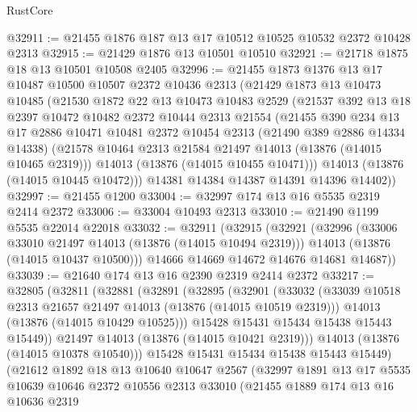 \begin{lexlean}{RustCore}
\begin{coremodule}
@32911 := @21455 @1876 @187 @13 @17 @10512 @10525 @10532 @2372 @10428 @2313
@32915 := @21429 @1876 @13 @10501 @10510
@32921 := @21718 @1875 @18 @13 @10501 @10508 @2405
@32996 := @21455
    @1873
    @1376
    @13
    @17
    @10487
    @10500
    @10507
    @2372
    @10436
    @2313
    (@21429
      @1873
      @13
      @10473
      @10485
      (@21530
        @1872
        @22
        @13
        @10473
        @10483
        @2529
        (@21537
          @392
          @13
          @18
          @2397
          @10472
          @10482
          @2372
          @10444
          @2313
          @21554
          (@21455
            @390
            @234
            @13
            @17
            @2886
            @10471
            @10481
            @2372
            @10454
            @2313
            (@21490 @389 @2886 @14334 @14338)
            (@21578 @10464 @2313 @21584 @21497 @14013 (@13876 (@14015 @10465 @2319)))
            @14013
            (@13876 (@14015 @10455 @10471)))
          @14013
          (@13876 (@14015 @10445 @10472)))
        @14381
        @14384
        @14387
        @14391
        @14396
        @14402))
@32997 := @21455 @1200
@33004 := @32997 @174 @13 @16 @5535 @2319 @2414 @2372
@33006 := @33004 @10493 @2313
@33010 := @21490 @1199 @5535 @22014 @22018
@33032 := @32911
    (@32915
      (@32921
        (@32996
          (@33006 @33010 @21497 @14013 (@13876 (@14015 @10494 @2319)))
          @14013
          (@13876 (@14015 @10437 @10500)))
        @14666
        @14669
        @14672
        @14676
        @14681
        @14687))
@33039 := @21640 @174 @13 @16 @2390 @2319 @2414 @2372
@33217 := @32805
    (@32811
      (@32881
        (@32891
          (@32895
            (@32901
              (@33032
                (@33039 @10518 @2313 @21657 @21497 @14013 (@13876 (@14015 @10519 @2319)))
                @14013
                (@13876 (@14015 @10429 @10525)))
              @15428
              @15431
              @15434
              @15438
              @15443
              @15449))
          @21497
          @14013
          (@13876 (@14015 @10421 @2319)))
        @14013
        (@13876 (@14015 @10378 @10540)))
      @15428
      @15431
      @15434
      @15438
      @15443
      @15449)
    (@21612
      @1892
      @18
      @13
      @10640
      @10647
      @2567
      (@32997
        @1891
        @13
        @17
        @5535
        @10639
        @10646
        @2372
        @10556
        @2313
        @33010
        (@21455
          @1889
          @174
          @13
          @16
          @10636
          @2319

\end{coremodule}
\end{lexlean}
